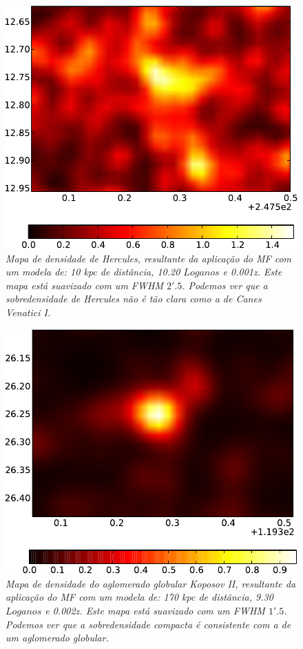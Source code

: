 \documentclass[
	12pt,				%
	openany,			%
	oneside,			%
	a4paper,			%
	english,			%
	brazil				%
	]{abntex2}
\begin{document}
\begin{figure}[H]
\begin{center}
\includegraphics[width=12cm]{figuras/mapa_densityHer.pdf}
\caption{\textit{Mapa de densidade de Hercules, resultante da aplicação do MF com um modela de: 10 kpc de distância, 10.20 $Log anos$ e 0.001z. Este mapa está suavizado com um FWHM $2'.5$. Podemos ver que a sobredensidade de Hercules não é tão clara como a de Canes Venatici I. }}
\label{fig:denmapHer}
\end{center}
\end{figure}
\vspace{0.5cm}

\begin{figure}[H]
\begin{center}
\includegraphics[width=12cm]{figuras/mapa_sparse_conv_Koposov2.pdf}
\caption{\textit{Mapa de densidade do aglomerado globular  Koposov II, resultante da aplicação do MF com um modela de: 170 kpc de distância, 9.30 $Log anos$ e 0.002z. Este mapa está suavizado com um FWHM $1'.5$. Podemos ver que a sobredensidade compacta  é consistente com a de um aglomerado globular. }}
\label{fig:denmapKoII}
\end{center}
\end{figure}
\vspace{0.5cm}
\end{document}
